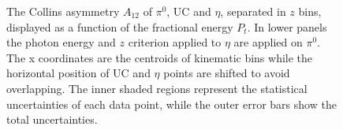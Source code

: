 \begin{figure}[H]
  \centering     
\caption{ The Collins asymmetry $A_{12}$ of $\pi^0$, UC and $\eta$, separated in $z$ bins, displayed as a function of the fractional energy $P_t$. In lower panels the photon energy and $z$ criterion applied to $\eta$ are applied on $\pi^0$. The x coordinates are the centroids of kinematic bins while the horizontal position of UC and $\eta$ points are shifted to avoid overlapping. The inner shaded regions represent the statistical uncertainties of each data point, while the outer error bars show the total uncertainties.}
\label{fig:finalasymmetry5}
\end{figure}


